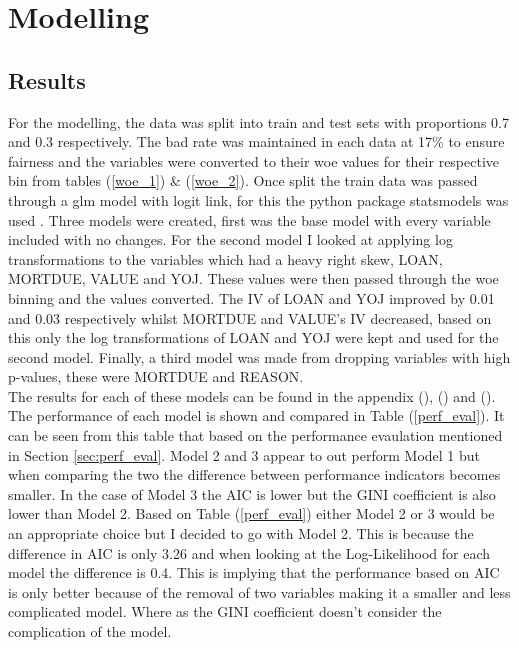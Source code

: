 \chapter{Modelling} \label{cha:chapter-3}

\section{Results}

For the modelling, the data was split into train and test sets with proportions 0.7 and 0.3 respectively. The bad rate was maintained in each data at 17\% to ensure fairness and the variables were converted to their woe values for their respective bin from tables  (\ref{woe_1}) \& (\ref{woe_2}). Once split the train data was passed through a glm model with logit link, for this the python package statsmodels was used \cite{statsmodels}. Three models were created, first was the base model with every variable included with no changes. For the second model I looked at applying log transformations to the variables which had a heavy right skew, LOAN, MORTDUE, VALUE and YOJ. These values were then passed through the woe binning and the values converted. The IV of LOAN and YOJ improved by 0.01 and 0.03 respectively whilst MORTDUE and VALUE's IV decreased, based on this only the log transformations of LOAN and YOJ were kept and used for the second model. Finally, a third model was made from dropping variables with high p-values, these were MORTDUE and REASON. \\

The results for each of these models can be found in the appendix (), () and (). The performance of each model is shown and compared in Table (\ref{perf_eval}). It can be seen from this table that based on the performance evaulation mentioned in Section \ref{sec:perf_eval}. Model 2 and 3 appear to out perform Model 1 but when comparing the two the difference between performance indicators becomes smaller. In the case of Model 3 the AIC is lower but the GINI coefficient is also lower than Model 2. Based on Table (\ref{perf_eval}) either Model 2 or 3 would be an appropriate choice but I decided to go with Model 2. This is because the difference in AIC is only 3.26 and when looking at the Log-Likelihood for each model the difference is 0.4. This is implying that the performance based on AIC is only better because of the removal of two variables making it a smaller and less complicated model. Where as the GINI coefficient doesn't consider the complication of the model. \\

